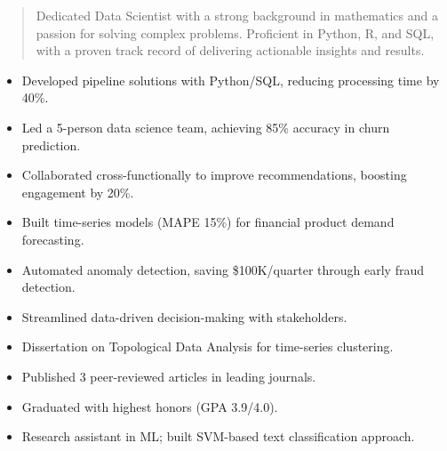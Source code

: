 \documentclass[10pt,a4paper]{altacv}
\begin{document}
\makecvheader

\begin{quote}
Dedicated Data Scientist with a strong background in mathematics and a passion
for solving complex problems. Proficient in Python, R, and SQL, with a proven
track record of delivering actionable insights and results.
\end{quote}

\begin{itemize}
  \item Developed pipeline solutions with Python/SQL, reducing processing time by 40\%.
  \item Led a 5-person data science team, achieving 85\% accuracy in churn prediction.
  \item Collaborated cross-functionally to improve recommendations, boosting engagement by 20\%.
\end{itemize}

\divider

\begin{itemize}
  \item Built time-series models (MAPE 15\%) for financial product demand forecasting.
  \item Automated anomaly detection, saving \$100K/quarter through early fraud detection.
  \item Streamlined data-driven decision-making with stakeholders.
\end{itemize}

\begin{itemize}
  \item Dissertation on Topological Data Analysis for time-series clustering.
  \item Published 3 peer-reviewed articles in leading journals.
\end{itemize}

\divider

\begin{itemize}
  \item Graduated with highest honors (GPA 3.9/4.0).
  \item Research assistant in ML; built SVM-based text classification approach.
\end{itemize}
\end{document}
